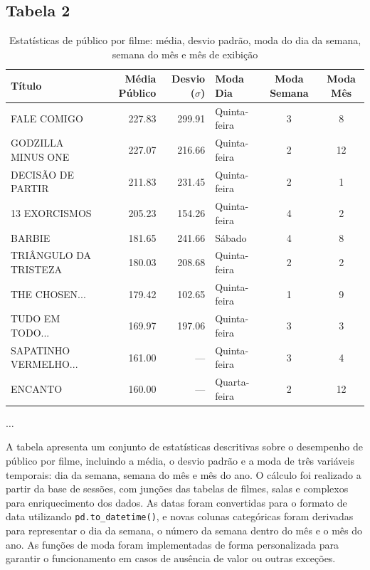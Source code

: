 \documentclass{article}
\begin{document}
\pagebreak
\subsection*{Tabela 2}

\begin{table}[H]
\centering
\caption{Estatísticas de público por filme: média, desvio padrão, moda do dia da semana, semana do mês e mês de exibição\\}
\begin{small}
\begin{tabularx}{\textwidth}{X r r l c c}
\hline
\textbf{Título} & \textbf{Média Público} & \textbf{Desvio ($\sigma$)} & \textbf{Moda Dia} & \textbf{Moda Semana} & \textbf{Moda Mês} \\
\hline
FALE COMIGO & 227.83 & 299.91 & Quinta-feira & 3 & 8 \\
GODZILLA MINUS ONE & 227.07 & 216.66 & Quinta-feira & 2 & 12 \\
DECISÃO DE PARTIR & 211.83 & 231.45 & Quinta-feira & 2 & 1 \\
13 EXORCISMOS & 205.23 & 154.26 & Quinta-feira & 4 & 2 \\
BARBIE & 181.65 & 241.66 & Sábado & 4 & 8 \\
TRIÂNGULO DA TRISTEZA & 180.03 & 208.68 & Quinta-feira & 2 & 2 \\
THE CHOSEN... & 179.42 & 102.65 & Quinta-feira & 1 & 9 \\
TUDO EM TODO... & 169.97 & 197.06 & Quinta-feira & 3 & 3 \\
SAPATINHO VERMELHO... & 161.00 & --- & Quinta-feira & 3 & 4 \\
ENCANTO & 160.00 & --- & Quarta-feira & 2 & 12 \\

\end{tabularx}
\end{small}
\begin{center}
$\ldots$
\end{center}
\end{table}
A tabela apresenta um conjunto de estatísticas descritivas sobre o desempenho de público por filme, incluindo a média, o desvio padrão e a moda de três variáveis temporais: dia da semana, semana do mês e mês do ano. O cálculo foi realizado a partir da base de sessões, com junções das tabelas de filmes, salas e complexos para enriquecimento dos dados. As datas foram convertidas para o formato de data utilizando \texttt{pd.to\_datetime()}, e novas colunas categóricas foram derivadas para representar o dia da semana, o número da semana dentro do mês e o mês do ano. As funções de moda foram implementadas de forma personalizada para garantir o funcionamento em casos de ausência de valor ou outras exceções.
\end{document}
